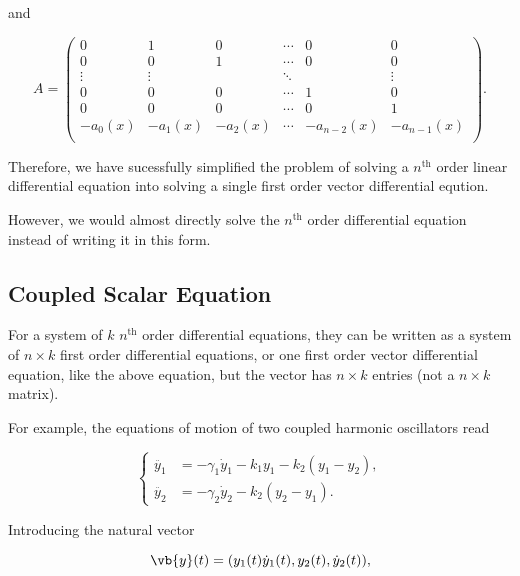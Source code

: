 \documentclass[english,a4paper,12pt]{report}
\begin{document}
and

\begin{equation}
    A = \begin{pmatrix}
        0 & 1 & 0 & \cdots  & 0 &  0 \\
        0 & 0 & 1 & \cdots  & 0 &  0 \\
        \vdots  & \vdots  &  & \ddots  &  & \vdots   \\
        0 & 0 & 0 & \cdots  & 1 &  0 \\
        0 & 0 & 0 & \cdots  & 0 &  1 \\
        -a_0(x)  & -a_1 (x) & -a_2 (x) & \cdots  & -a_{n-2}(x)  & -a_{n-1}(x)   \\
    \end{pmatrix}.
\end{equation}

Therefore, we have sucessfully simplified the problem of solving a \(n^{\text{th}} \) order linear differential equation into solving a single first order vector differential eqution. 

However, we would almost directly solve the \(n^{\text{th}} \) order differential equation instead of writing it in this form. 

\subsection{Coupled Scalar Equation}

For a system of \(k\) \(n^{\text{th}} \) order differential equations, they can be written as a system of \(n \times k\) first order differential equations, or one first order vector differential equation, like the above equation, but the vector has \(n \times k\) entries (not a \(n \times k\) matrix).

For example, the equations of motion of two coupled harmonic oscillators read

\begin{equation} \label{harmon} 
    \begin{cases}
        \ddot{y_1 } &= -\gamma _{1}  \dot{y}_{1}  - k_1 y_1 - k_2 (y_1 -y_2 ), \\
        \ddot{y_2 } &= -\gamma _{2} \dot{y}_{2}  - k_2 (y_2 -y_1 ).
    \end{cases}    
\end{equation}

Introducing the natural vector 

\begin{equation}
    \vb{y} (t) = (y_1 (t) \dot{y}_{1} (t), y_2 (t), \dot{y}_{2} (t) ),
\end{equation}
\end{document}
